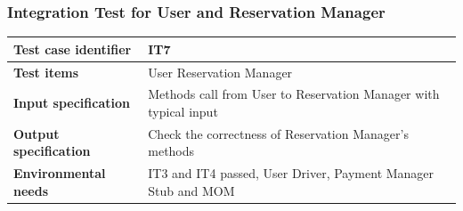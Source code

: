 \documentclass{article}
\begin{document}
			\subsubsection{Integration Test for User and Reservation Manager} \label{sec:3.1.5}
				\begin{minipage}{\linewidth}
				\end{minipage}
				\begin{center}
					\setlength{\tabcolsep}{24pt}
					\renewcommand{\arraystretch}{1.4}
					\begin{tabular}{ | l | p{8cm} |}\hline
						\textbf{Test case identifier} & IT7\\\hline
						\textbf{Test items} & User \textrightarrow Reservation Manager\\\hline
						\textbf{Input specification} & Methods call from User to Reservation Manager with typical input \\\hline
						\textbf{Output specification} & Check the correctness of Reservation Manager's methods \\\hline
						\textbf{Environmental needs} & IT3 and IT4 passed, User Driver, Payment Manager Stub and MOM \\\hline
					\end{tabular}
				\end{center}
				\pagebreak
\end{document}
